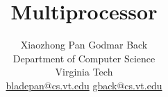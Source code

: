 \documentclass[letterpaper,twocolumn,10pt]{article}
\begin{document}
\title{\Large \bf Multiprocessor \cb}

\author{Xiaozhong Pan  \qquad  Godmar Back\\
Department of Computer Science\\ 
Virginia Tech\\
\url{bladepan@cs.vt.edu} \qquad  \url{gback@cs.vt.edu}
}




\maketitle
\thispagestyle{empty}


\newpage







\newpage

{\footnotesize 
}

\end{document}
